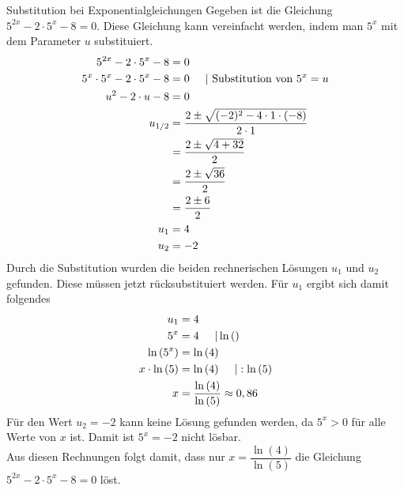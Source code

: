 \begin{bsp}{Substitution bei Exponentialgleichungen}{}
\mbox{}
Gegeben ist die Gleichung $5^{2x} -2\cdot 5^x -8 =0$. Diese Gleichung kann vereinfacht werden, indem man $5^x$ mit dem Parameter $u$ substituiert.
\begin{equation*}
    \begin{split}
     5^{2x} -2\cdot 5^x -8 &=0\\
     5^x\cdot 5^x -2\cdot 5^x -8 &=0\hspace{0.5cm} | \text{ Substitution von } 5^x=u\\
        u^2 -2\cdot u -8 &=0\\
        u_{1/2} &= \dfrac{2\pm \sqrt{(-2)^2 -4\cdot 1\cdot (-8)}}{2\cdot 1}\\
        &=\dfrac{2\pm \sqrt{4+32}}{2}\\
        &=\dfrac{2\pm \sqrt{36}}{2}\\
        &= \dfrac{2\pm 6}{2}\\
        u_1 &= 4\\
        u_2 &= -2 
    \end{split}
\end{equation*}
Durch die Substitution wurden die beiden rechnerischen Lösungen $u_1$ und $u_2$ gefunden. Diese müssen jetzt rücksubstituiert werden. Für $u_1$ ergibt sich damit folgendes
\begin{equation*}
    \begin{split}
u_1&=4\\
5^x&=4\hspace{0.5cm} | \ln{()}\\
\ln{(5^x)}&= \ln{(4)}\\
x\cdot\ln{(5)} &= \ln{(4)}\hspace{0.5cm }| : \ln{(5)}\\
x&= \dfrac{\ln{(4)} }{\ln{(5)} } \approx 0,86
    \end{split}
\end{equation*}
Für den Wert $u_2 = -2$ kann keine Lösung gefunden werden, da $5^x > 0$ für alle Werte von $x$ ist. Damit ist $5^x= -2$ nicht lösbar.\\
Aus diesen Rechnungen folgt damit, dass nur $x=\dfrac{\ln{(4)}}{\ln{(5)}}$ die Gleichung $5^{2x} -2\cdot 5^x -8 =0$ löst.
\end{bsp}
